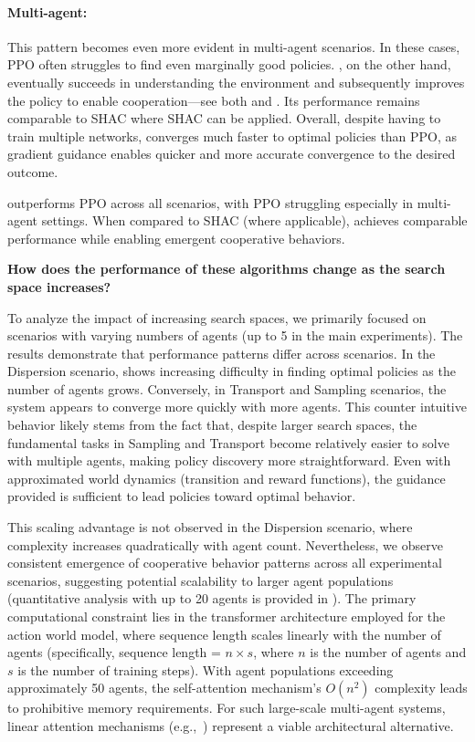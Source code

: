 \noindent\paragraph{Multi-agent:} This pattern becomes even more evident in multi-agent scenarios. In these cases, PPO often struggles to find even marginally good policies. \fname{}, on the other hand, eventually succeeds in understanding the environment and subsequently improves the policy to enable cooperation---see both  and . Its performance remains comparable to SHAC where SHAC can be applied.
Overall, despite having to train multiple networks, \fname{} converges much faster to optimal policies than PPO, as gradient guidance enables quicker and more accurate convergence to the desired outcome.

\begin{replybox}
\fname{} outperforms PPO across all scenarios, with PPO struggling especially in multi-agent settings. When compared to SHAC (where applicable), \fname{} achieves comparable performance while enabling emergent cooperative behaviors.
\end{replybox}

\begin{rqbox}
\textbf{How does the performance of these algorithms change as the search space increases?}
\end{rqbox}

To analyze the impact of increasing search spaces, we primarily focused on scenarios with varying numbers of agents (up to 5 in the main experiments). The results demonstrate that performance patterns differ across scenarios. In the Dispersion scenario, \fname{} shows increasing difficulty in finding optimal policies as the number of agents grows. Conversely, in Transport and Sampling scenarios, the system appears to converge more quickly with more agents. This counter intuitive behavior likely stems from the fact that, despite larger search spaces, the fundamental tasks in Sampling and Transport become relatively easier to solve with multiple agents, making policy discovery more straightforward. Even with approximated world dynamics (transition and reward functions), the guidance provided is sufficient to lead policies toward optimal behavior.

This scaling advantage is not observed in the Dispersion scenario, where complexity increases quadratically with agent count. Nevertheless, we observe consistent emergence of cooperative behavior patterns across all experimental scenarios, suggesting potential scalability to larger agent populations (quantitative analysis with up to 20 agents is provided in ). The primary computational constraint lies in the transformer architecture employed for the action world model, where sequence length scales linearly with the number of agents (specifically, sequence length = $n \times s$, where $n$ is the number of agents and $s$ is the number of training steps). With agent populations exceeding approximately 50 agents, the self-attention mechanism's $O(n^2)$ complexity leads to prohibitive memory requirements. For such large-scale multi-agent systems, linear attention mechanisms (e.g.,~\cite{Beltagy20}) represent a viable architectural alternative.

